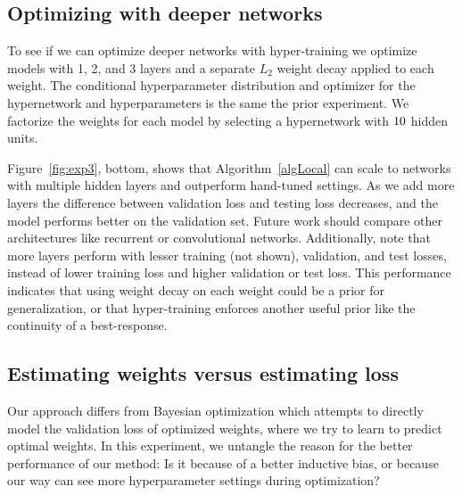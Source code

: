 \documentclass{article} %
\newcommand{\param}{\mathrm{w}} %
\begin{document}
\subsection{Optimizing with deeper networks}
To see if we can optimize deeper networks with hyper-training we optimize models with 1, 2, and 3 layers and a separate $L_{2}$ weight decay applied to each weight.
The conditional hyperparameter distribution and optimizer for the hypernetwork and hyperparameters is the same the prior experiment.
We factorize the weights for each model by selecting a hypernetwork with $10$ hidden units.

Figure~\ref{fig:exp3}, bottom, shows that Algorithm~\ref{algLocal} can scale to networks with multiple hidden layers and outperform hand-tuned settings.
As we add more layers the difference between validation loss and testing loss decreases, and the model performs better on the validation set.
Future work should compare other architectures like recurrent or convolutional networks.
Additionally, note that more layers perform with lesser training (not shown), validation, and test losses, instead of lower training loss and higher validation or test loss.
This performance indicates that using weight decay on each weight could be a prior for generalization, or that hyper-training enforces another useful prior like the continuity of a best-response.
%
%
%


\subsection{Estimating weights versus estimating loss}
Our approach differs from Bayesian optimization which attempts to directly model the validation loss of optimized weights, where we try to learn to predict optimal weights.
In this experiment, we untangle the reason for the better performance of our method:
Is it because of a better inductive bias, or because our way can see more hyperparameter settings during optimization?
\end{document}
